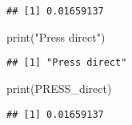\documentclass[
]{article}
\newenvironment{Shaded}{\begin{snugshade}}{\end{snugshade}}
\newcommand{\FunctionTok}[1]{\textcolor[rgb]{0.00,0.00,0.00}{#1}}
\newcommand{\NormalTok}[1]{#1}
\newcommand{\StringTok}[1]{\textcolor[rgb]{0.31,0.60,0.02}{#1}}
\begin{document}
\begin{verbatim}
## [1] 0.01659137
\end{verbatim}

\begin{Shaded}
\begin{Highlighting}[]
\FunctionTok{print}\NormalTok{(}\StringTok{"Press direct"}\NormalTok{)}
\end{Highlighting}
\end{Shaded}

\begin{verbatim}
## [1] "Press direct"
\end{verbatim}

\begin{Shaded}
\begin{Highlighting}[]
\FunctionTok{print}\NormalTok{(PRESS\_direct)}
\end{Highlighting}
\end{Shaded}

\begin{verbatim}
## [1] 0.01659137
\end{verbatim}
\end{document}
